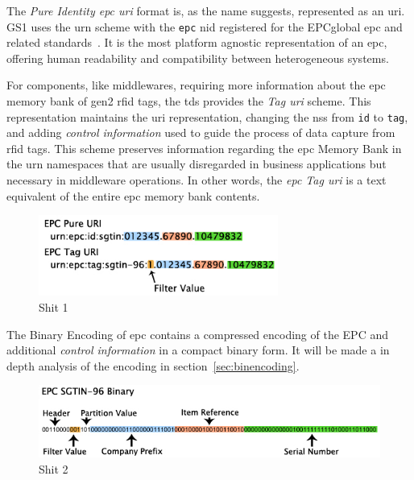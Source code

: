 The \emph{Pure Identity \ac{epc} \ac{uri}} format is, as the name suggests, represented as an \ac{uri}.
GS1 uses the \ac{urn} scheme with the \texttt{epc} \ac{nid} registered for the EPCglobal \ac{epc} and related standards~\cite{meallingUniformResourceName}.
It is the most platform agnostic representation of an \ac{epc}, offering human readability and compatibility between heterogeneous systems. 

For components, like middlewares, requiring more information about the \ac{epc} memory bank of \ac{gen2} \ac{rfid} tags, the \ac{tds} provides the \emph{Tag \ac{uri}} scheme.
This representation maintains the \ac{uri} representation, changing the \ac{nss} from \texttt{id} to \texttt{tag}, and adding \textit{control information} used to guide the process of data capture from \ac{rfid} tags.
This scheme preserves information regarding the \ac{epc} Memory Bank in the \ac{urn} namespaces that are usually disregarded in business applications but necessary in middleware operations.
In other words, the \emph{\ac{epc} Tag \ac{uri}} is a text equivalent of the entire \ac{epc} memory bank contents.

\begin{figure}[!ht]
    \centering
    \includegraphics[width=0.7\textwidth]{./figs/02-state-of-the-art/SGTIN_First2encodings.jpg}
    \caption{Shit 1~\cite{SGTININFO}} 
    \label{fig:1111}
\end{figure}

The Binary Encoding of \ac{epc} contains a compressed encoding of the EPC and additional \textit{control information} in a compact binary form.
It will be made a in depth analysis of the encoding in section~\ref{sec:binencoding}.

\begin{figure}[!ht]
    \centering
    \includegraphics[width=\textwidth]{./figs/02-state-of-the-art/SGTIN_binaryconv2.jpg}
    \caption{Shit 2~\cite{SGTININFO}} 
    \label{fig:2222}
\end{figure}

